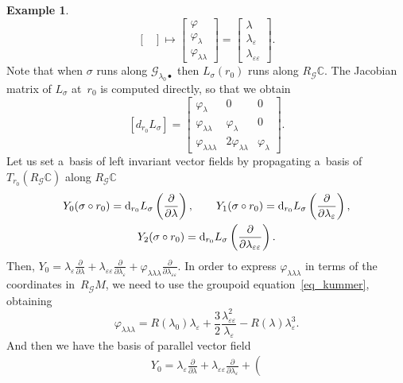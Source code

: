 \documentclass[pdftex]{sigma}
\numberwithin{equation}{section}
\theoremstyle{definition}
\newtheorem{Example}[Theorem]{Example}
\begin{document}
\begin{Example}
\[\begin{bmatrix}
\end{bmatrix}
\mapsto
\begin{bmatrix}
\varphi \\ \varphi_\lambda \\ \varphi_{\lambda\lambda}
\end{bmatrix} =
\begin{bmatrix}
\lambda \\ \lambda_\varepsilon \\ \lambda_{\varepsilon\varepsilon}
\end{bmatrix}.
\]
Note that when $\sigma$ runs along $\mathcal G_{\lambda_0\bullet}$ then $L_\sigma(r_0)$ runs along $R_\mathcal G\mathbb C$. The Jacobian matrix of $L_{\sigma}$ at~$r_0$ is computed directly, so that we obtain
\[[d_{r_0}L_\sigma] =
\begin{bmatrix}
 \varphi_\lambda & 0 & 0 \\
 \varphi_{\lambda\lambda} & \varphi_\lambda & 0 \\
 \varphi_{\lambda\lambda\lambda} & 2\varphi_{\lambda\lambda} & \varphi_\lambda
\end{bmatrix}.
\]
Let us set a~basis of left invariant vector fields by propagating a~basis of $T_{r_0}(R_\mathcal G\mathbb C)$ along $R_{\mathcal G}\mathbb C$
\begin{gather*}
Y_0(\sigma\circ r_0)= {\rm d}_{r_0}L_\sigma \left(\frac{\partial}{\partial \lambda} \right),\qquad
Y_1(\sigma \circ r_0)= {\rm d}_{r_0}L_\sigma \left(\frac{\partial}{\partial \lambda_{\varepsilon}} \right),\\
Y_2(\sigma \circ r_0)= {\rm d}_{r_0}L_\sigma \left(\frac{\partial}{\partial \lambda_{\varepsilon\varepsilon}} \right).
\end{gather*}
Then,
$Y_0 = \lambda_\varepsilon\frac{\partial}{\partial \lambda} + \lambda_{\varepsilon\varepsilon}\frac{\partial}{\partial \lambda_\varepsilon} + \varphi_{\lambda\lambda\lambda}\frac{\partial}{\partial \lambda_{\varepsilon\varepsilon}}$.
In order to express $\varphi_{\lambda\lambda\lambda}$ in terms of the coordinates in~$R_\mathcal GM$, we need to use the groupoid equation~\eqref{eq_kummer}, obtaining
\[\varphi_{\lambda\lambda\lambda} = R(\lambda_0)\lambda_{\varepsilon} + \frac{3}{2}\frac{\lambda_{\varepsilon\varepsilon}^2}{\lambda_\varepsilon} - R(\lambda)\lambda_\varepsilon^3.
\]
And then we have the basis of parallel vector field
\begin{gather*}
Y_0 = \lambda_\varepsilon\frac{\partial}{\partial \lambda} + \lambda_{\varepsilon\varepsilon}\frac{\partial}{\partial \lambda_\varepsilon} +\left(

\end{gather*}
\end{Example}
\end{document}
